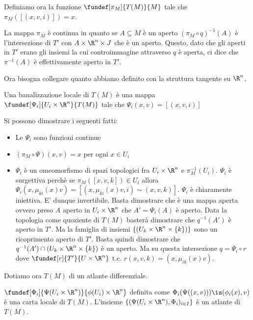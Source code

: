 Definiamo ora la funzione $\fundef[\pi_M]{T(M)}{M}$ tale che $\pi_M([(x, v, i)])=x$. 
\begin{oss}
La mappa $\pi_M$ è continua in quanto se $A\subseteq M$ è un aperto $(\pi_M\circ q)^{-1}(A)$ è l'intersezione di $T'$ con $A\times \R^n \times J$ che è un aperto. Questo, dato che gli aperti in $T'$ erano gli insiemi la cui controimmagine attraverso $q$ è aperta, ci dice che $\pi^{-1}(A)$ è effettivamente aperto in $T'$.
\end{oss}



Ora bisogna collegare quanto abbiamo definito con la struttura tangente su $\R^n$. 
\begin{defn}
Una banalizzazione locale di $T(M)$ è una mappa $\fundef[\Psi_i]{U_i\times\R^n}{T(M)}$ tale che $\Psi_i(x, v)=[(x, v, i)]$ 
\end{defn}
\begin{oss}
Si possono dimostrare i seguenti fatti:
\begin{itemize}
\item Le $\Psi_i$ sono funzioni continue
\item $(\pi_M \circ \Psi)(x, v)=x$ per ogni $x\in U_i$
\item $\Psi_i$ è un omeomorfismo di spazi topologici fra $U_i \times \R^n$ e $\pi_M^{-1}(U_i)$. $\Psi_i$ è surgettiva perchè se $\pi_M([x, v, k])\in U_i$ allora $\Psi_i(x, \mu_{ki}(x)v)=[(x, \mu_{ki}(x)v, i)\sim (x, v, k)]$. $\Psi_i$ è chiaramente iniettiva. E' dunque invertibile. Basta dimostrare che è una mappa aperta ovvero preso $A$ aperto in $U_i\times \R^n$ che $A'=\Psi_i(A)$ è aperto. Data la topologia come quoziente di $T(M)$ basterà dimostrare che $q^{-1}(A')$ è aperto in $T'$. Ma la famiglia di insiemi $\{(U_k\times \R^n\times\{k\})\}$ sono un ricoprimento aperto di $T'$. Basta quindi dimostrare che $q^{-1}(A')\cap (U_k\times \R^n\times\{k\})$ è un aperto. Ma su questa intersezione $q=\Psi_i\circ r $ dove $\fundef[r]{T'}{U\times \R^n}$ t.c. $r(x, v, k)=(x, \mu_{ik}(x)v)$.
\end{itemize}
\end{oss}
Dotiamo ora $T(M)$ di un atlante differenziale.
\begin{defn}[Carte di $T(M)$]
$\fundef[\Phi_i]{\Psi(U_i\times \R^n)}{\phi(U_i)\times \R^n}$ definita come $\Phi_i(\Psi((x, v)))\is(\phi_i(x),v)$ è una carta locale di $T(M)$. L'insieme $\{(\Psi(U_i\times\R^n), \Phi_i)_{i\in I}\}$ è un atlante di $T(M)$.
\end{defn}

